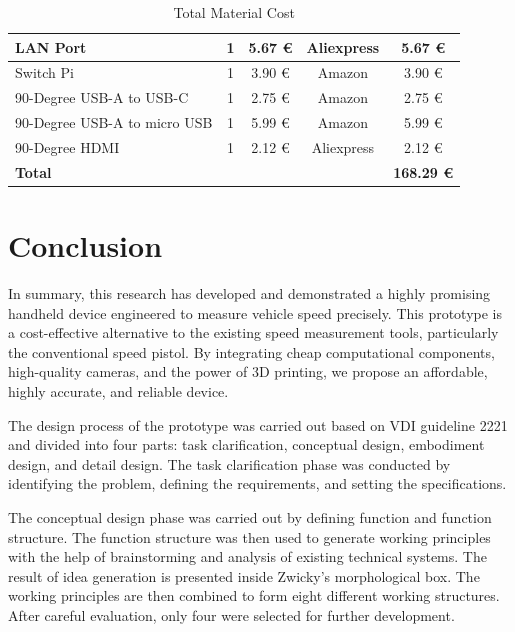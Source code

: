 \begin{table}[!ht]
\begin{tabular}{|l|c|c|c|c|}
        LAN Port                     & 1               & 5.67 €         & Aliexpress       & 5.67 €               \\ \hline
        Switch Pi                    & 1               & 3.90 €         & Amazon           & 3.90 €               \\ \hline
        90-Degree USB-A to USB-C     & 1               & 2.75 €         & Amazon           & 2.75 €               \\ \hline
        90-Degree USB-A to micro USB & 1               & 5.99 €         & Amazon           & 5.99 €               \\ \hline
        90-Degree HDMI               & 1               & 2.12 €         & Aliexpress       & 2.12 €               \\ \hline
        \textbf{Total}               & ~               & ~              & ~                & \textbf{168.29 €}    \\ \hline
    \end{tabular}
    \caption{Total Material Cost}
    \label{tab:totalmaterialcost}
\end{table}


\chapter{Conclusion}
In summary, this research has developed and demonstrated a highly promising handheld device engineered to measure vehicle speed precisely. This prototype is a cost-effective alternative to the existing speed measurement tools, particularly the conventional speed pistol. By integrating cheap computational components, high-quality cameras, and the power of 3D printing, we propose an affordable, highly accurate, and reliable device.

The design process of the prototype was carried out based on VDI guideline 2221 and divided into four parts: task clarification, conceptual design, embodiment design, and detail design. The task clarification phase was conducted by identifying the problem, defining the requirements, and setting the specifications.

The conceptual design phase was carried out by defining function and function structure. The function structure was then used to generate working principles with the help of brainstorming and analysis of existing technical systems. The result of idea generation is presented inside Zwicky's morphological box. The working principles are then combined to form eight different working structures. After careful evaluation, only four were selected for further development.

